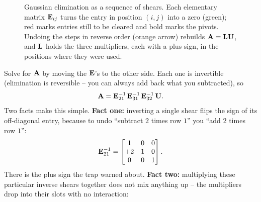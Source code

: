 \begin{figure}[H]
\caption{Gaussian elimination as a sequence of shears. Each elementary matrix $\mathbf{E}_{ij}$ turns the entry in position $(i,j)$ into a zero (green); red marks entries still to be cleared and bold marks the pivots. Undoing the steps in reverse order (orange arrow) rebuilds $\mathbf{A} = \mathbf{L}\mathbf{U}$, and $\mathbf{L}$ holds the three multipliers, each with a plus sign, in the positions where they were used.}
\label{ch09:fig-shear-sequence}
\end{figure}
Solve for $\mathbf{A}$ by moving the $\mathbf{E}$'s to the other side. Each one is invertible
(elimination is reversible -- you can always add back what you subtracted), so
\[
  \mathbf{A} = \mathbf{E}_{21}^{-1}\,\mathbf{E}_{31}^{-1}\,\mathbf{E}_{32}^{-1}\,\mathbf{U}.
\]
Two facts make this simple. \textbf{Fact one:} inverting a single shear flips the sign of its
off-diagonal entry, because to undo ``subtract $2$ times row $1$'' you ``add $2$ times row
$1$'':
\[
  \mathbf{E}_{21}^{-1} = \begin{bmatrix} 1&0&0\\ +2&1&0\\0&0&1 \end{bmatrix}.
\]
There is the plus sign the trap warned about. \textbf{Fact two:} multiplying these
particular inverse shears together does not mix anything up -- the multipliers drop
into their slots with no interaction:
